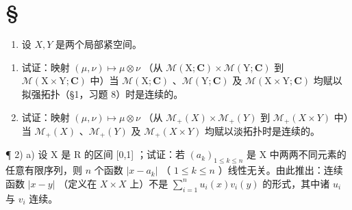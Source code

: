 \section*{\texorpdfstring{\S\CurrentExerciseGroup}{第{\CurrentExerciseGroup}节}}
{}

\begin{enumerate}
\def\labelenumi{\arabic{enumi})}
\tightlist
\item
  设 \(X, Y\) 是两个局部紧空间。
\end{enumerate}

\begin{enumerate}
\def\labelenumi{\alph{enumi})}
\item
  试证：映射 \((\mu, \nu) \mapsto \mu \otimes \nu\) （从 \(\mathcal{M}(\mathrm{X};\mathbf{C}) \times \mathcal{M}(\mathrm{Y};\mathbf{C})\) 到 \(\mathcal{M}(\mathrm{X} \times \mathrm{Y};\mathbf{C})\) 中）当 \(\mathcal{M}(\mathrm{X};\mathbf{C})\) 、\(\mathcal{M}(\mathrm{Y};\mathbf{C})\) 及 \(\mathcal{M}(\mathrm{X} \times \mathrm{Y};\mathbf{C})\) 均赋以拟强拓扑（§1，习题 8）时是连续的。
\item
  试证：映射 \((\mu, \nu) \mapsto \mu \otimes \nu\) （从 \(\mathcal{M}_{+}(X) \times \mathcal{M}_{+}(Y)\) 到 \(\mathcal{M}_{+}(X \times Y)\) 中）当 \(\mathcal{M}_{+}(X)\) 、\(\mathcal{M}_{+}(Y)\) 及 \(\mathcal{M}_{+}(X \times Y)\) 均赋以淡拓扑时是连续的。
\end{enumerate}

¶ 2) a) 设 X 是 R 的区间 {[}0,1{]} ；试证：若 \((a_k)_{1 \leqslant k \leqslant n}\) 是 X 中两两不同元素的任意有限序列，则 \(n\) 个函数 \(|x - a_k|\) （ \(1 \leqslant k \leqslant n\) ）线性无关。由此推出：连续函数 \(|x - y|\) （定义在 \(X \times X\) 上）不是 \(\sum_{i=1}^{n} u_i(x)v_i(y)\) 的形式，其中诸 \(u_i\) 与 \(v_i\) 连续。

